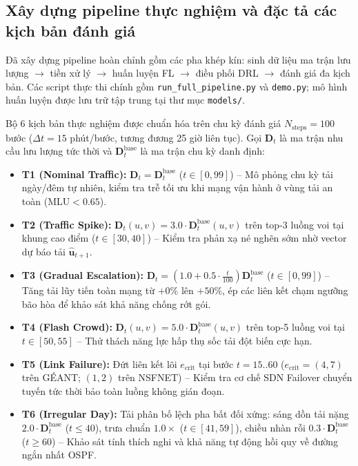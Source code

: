 \documentclass[11pt,a4paper]{article}
\begin{document}
\subsection{Xây dựng pipeline thực nghiệm và đặc tả các kịch bản đánh giá}
Đã xây dựng pipeline hoàn chỉnh gồm các pha khép kín: sinh dữ liệu ma trận lưu lượng $\to$ tiền xử lý $\to$ huấn luyện FL $\to$ điều phối DRL $\to$ đánh giá đa kịch bản. Các script thực thi chính gồm \texttt{run\_full\_pipeline.py} và \texttt{demo.py}; mô hình huấn luyện được lưu trữ tập trung tại thư mục \texttt{models/}.

Bộ 6 kịch bản thực nghiệm được chuẩn hóa trên chu kỳ đánh giá $N_{\text{steps}} = 100$ bước ($\Delta t = 15$ phút/bước, tương đương 25 giờ liên tục). Gọi $\mathbf{D}_t$ là ma trận nhu cầu lưu lượng tức thời và $\mathbf{D}_t^{\text{base}}$ là ma trận chu kỳ danh định:

\begin{itemize}[leftmargin=1.5em, itemsep=0.4ex]
    \item \textbf{T1 (Nominal Traffic):} $\mathbf{D}_t = \mathbf{D}_t^{\text{base}}$ ($t \in [0, 99]$) -- Mô phỏng chu kỳ tải ngày/đêm tự nhiên, kiểm tra trễ tối ưu khi mạng vận hành ở vùng tải an toàn ($\text{MLU} < 0.65$).
    \item \textbf{T2 (Traffic Spike):} $\mathbf{D}_t(u, v) = 3.0 \cdot \mathbf{D}_t^{\text{base}}(u, v)$ trên top-3 luồng voi tại khung cao điểm ($t \in [30, 40]$) -- Kiểm tra phản xạ né nghẽn sớm nhờ vector dự báo tải $\hat{\mathbf{u}}_{t+1}$.
    \item \textbf{T3 (Gradual Escalation):} $\mathbf{D}_t = (1.0 + 0.5 \cdot \frac{t}{100}) \mathbf{D}_t^{\text{base}}$ ($t \in [0, 99]$) -- Tăng tải lũy tiến toàn mạng từ $+0\%$ lên $+50\%$, ép các liên kết chạm ngưỡng bão hòa để khảo sát khả năng chống rớt gói.
    \item \textbf{T4 (Flash Crowd):} $\mathbf{D}_t(u, v) = 5.0 \cdot \mathbf{D}_t^{\text{base}}(u, v)$ trên top-5 luồng voi tại $t \in [50, 55]$ -- Thử thách năng lực hấp thụ sốc tải đột biến cực hạn.
    \item \textbf{T5 (Link Failure):} Đứt liên kết lõi $e_{\text{crit}}$ tại bước $t = 15..60$ ($e_{\text{crit}} = (4, 7)$ trên GÉANT; $(1, 2)$ trên NSFNET) -- Kiểm tra cơ chế SDN Failover chuyển tuyến tức thời bảo toàn luồng không gián đoạn.
    \item \textbf{T6 (Irregular Day):} Tải phân bố lệch pha bất đối xứng: sáng dồn tải nặng $2.0 \cdot \mathbf{D}_t^{\text{base}}$ ($t \le 40$), trưa chuẩn $1.0\times$ ($t \in [41, 59]$), chiều nhàn rỗi $0.3 \cdot \mathbf{D}_t^{\text{base}}$ ($t \ge 60$) -- Khảo sát tính thích nghi và khả năng tự động hồi quy về đường ngắn nhất OSPF.
\end{itemize}
\end{document}
